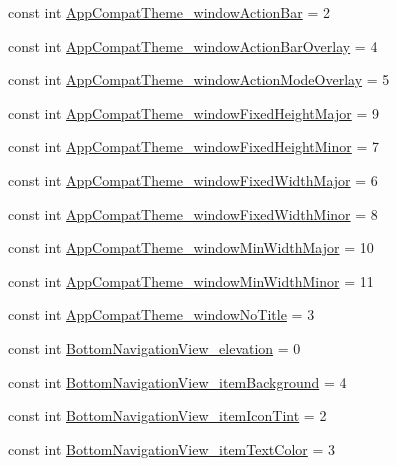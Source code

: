 \begin{CompactItemize}
\item 
const int \hyperlink{class__2doo_1_1_droid_1_1_resource_1_1_styleable_4f419a353999a5e411a7ac69c3c9ea10}{AppCompatTheme\_\-windowActionBar} = 2
\item 
const int \hyperlink{class__2doo_1_1_droid_1_1_resource_1_1_styleable_13db1f57b9eda77549eab417bb90f7d8}{AppCompatTheme\_\-windowActionBarOverlay} = 4
\item 
const int \hyperlink{class__2doo_1_1_droid_1_1_resource_1_1_styleable_4e26820c184d40a084ca7179e940b203}{AppCompatTheme\_\-windowActionModeOverlay} = 5
\item 
const int \hyperlink{class__2doo_1_1_droid_1_1_resource_1_1_styleable_b59c8ac2b6d1a704fd57086dcab7e66d}{AppCompatTheme\_\-windowFixedHeightMajor} = 9
\item 
const int \hyperlink{class__2doo_1_1_droid_1_1_resource_1_1_styleable_3154cfa7ec1b7b517072f6412e5eaef9}{AppCompatTheme\_\-windowFixedHeightMinor} = 7
\item 
const int \hyperlink{class__2doo_1_1_droid_1_1_resource_1_1_styleable_86ced93cb40540ce5906bb88ff71107a}{AppCompatTheme\_\-windowFixedWidthMajor} = 6
\item 
const int \hyperlink{class__2doo_1_1_droid_1_1_resource_1_1_styleable_f256d4f22feafdcbe7cb706b4fc6bd14}{AppCompatTheme\_\-windowFixedWidthMinor} = 8
\item 
const int \hyperlink{class__2doo_1_1_droid_1_1_resource_1_1_styleable_286ef503832cbbcb2e76cc0af2b35a16}{AppCompatTheme\_\-windowMinWidthMajor} = 10
\item 
const int \hyperlink{class__2doo_1_1_droid_1_1_resource_1_1_styleable_b5ffef90c85f3e162134b794d720c935}{AppCompatTheme\_\-windowMinWidthMinor} = 11
\item 
const int \hyperlink{class__2doo_1_1_droid_1_1_resource_1_1_styleable_454b48ea6e5b5240d7c43ca967fea8e3}{AppCompatTheme\_\-windowNoTitle} = 3
\item 
const int \hyperlink{class__2doo_1_1_droid_1_1_resource_1_1_styleable_921741984446d0366cf7f6b3da4e81b9}{BottomNavigationView\_\-elevation} = 0
\item 
const int \hyperlink{class__2doo_1_1_droid_1_1_resource_1_1_styleable_db2596b66c8ca067af314cdd7916b0a3}{BottomNavigationView\_\-itemBackground} = 4
\item 
const int \hyperlink{class__2doo_1_1_droid_1_1_resource_1_1_styleable_d6bba5d82635842fd260c9f8db398349}{BottomNavigationView\_\-itemIconTint} = 2
\item 
const int \hyperlink{class__2doo_1_1_droid_1_1_resource_1_1_styleable_272b9215408f726c995693852d23059b}{BottomNavigationView\_\-itemTextColor} = 3

\end{CompactItemize}
